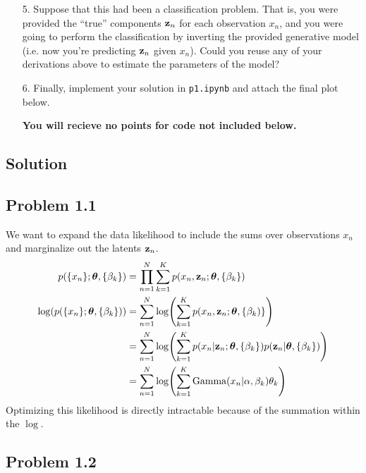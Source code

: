 \documentclass[submit]{harvardml}
\begin{document}
\begin{framed}
\begin{enumerate}
\item[5.] Suppose that this had been a classification problem. That is,
  you were provided the ``true'' components $\mathbf{z}_n$ for each
  observation $x_n$,
  and you were going to perform the classification by
  inverting the provided generative model (i.e. now you're predicting $\mathbf{z}_n$ given $x_n$). Could you reuse any of
  your derivations above to estimate the parameters of the model?
  

\item[6.] Finally, implement your solution in \texttt{p1.ipynb} and attach the final plot below.

{\bfseries You will recieve no points for code not included below.}
\end{enumerate}
  
\end{framed}

\newpage
\subsection*{Solution}

\subsection*{Problem 1.1}

We want to expand the data likelihood to include the sums over observations $x_n$ and marginalize out the latents $\vb{z}_n$.
\begin{align*}
    p(\{ x_n \} ; \boldsymbol{\theta}, \{ \beta_k \}) &= \prod_{n=1}^N \sum_{k=1}^K p(x_n, \vb{z}_n; \boldsymbol{\theta}, \{ \beta_k \}) \\
    \log(p(\{ x_n \} ; \boldsymbol{\theta}, \{ \beta_k \})) &= \sum_{n=1}^N \log(\sum_{k=1}^K p(x_n, \vb{z}_n ; \boldsymbol{\theta}, \{ \beta_k) \}) \\
    &= \sum_{n=1}^N \log(\sum_{k=1}^K p(x_n | \vb{z}_n ; \boldsymbol{\theta}, \{ \beta_k \}) p(\vb{z}_n | \boldsymbol{\theta}, \{ \beta_k \})) \\
    &= \sum_{n=1}^N \log(\sum_{k=1}^K \text{Gamma}(x_n | \alpha, \beta_k) \theta_k)
\end{align*}
Optimizing this likelihood is directly intractable because of the summation within the $\log$.

\subsection*{Problem 1.2}
\end{document}
